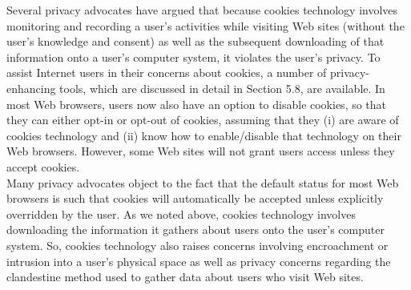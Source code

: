 \documentclass[12pt]{article}
\theoremstyle{definition}
\begin{document}
Several privacy advocates have argued that because cookies technology involves
monitoring and recording a user’s activities while visiting Web sites (without the user’s
knowledge and consent) as well as the subsequent downloading of that information onto
a user’s computer system, it violates the user’s privacy. To assist Internet users in their
concerns about cookies, a number of privacy-enhancing tools, which are discussed in
detail in Section 5.8, are available. In most Web browsers, users now also have an
option to disable cookies, so that they can either opt-in or opt-out of cookies, assuming
that they (i) are aware of cookies technology and (ii) know how to enable/disable that
technology on their Web browsers. However, some Web sites will not grant users access
unless they accept cookies.\\
Many privacy advocates object to the fact that the default status for most Web
browsers is such that cookies will automatically be accepted unless explicitly overridden
by the user. As we noted above, cookies technology involves downloading the information
it gathers about users onto the user’s computer system. So, cookies technology also
raises concerns involving encroachment or intrusion into a user’s physical space as well as
privacy concerns regarding the clandestine method used to gather data about users who
visit Web sites.
\end{document}
